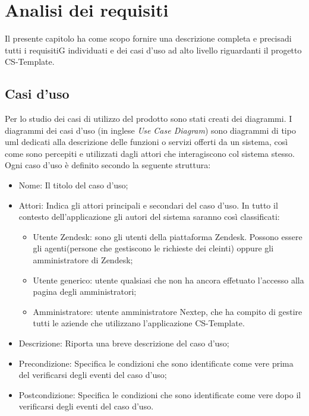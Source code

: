 
\chapter{Analisi dei requisiti}
\label{cap:analisi-requisiti}
Il presente capitolo ha come scopo fornire una descrizione completa e precisadi tutti i requisitiG individuati e dei casi d’uso ad alto livello riguardanti il progetto CS-Template.

\section{Casi d'uso}

Per lo studio dei casi di utilizzo del prodotto sono stati creati dei diagrammi.
I diagrammi dei casi d'uso (in inglese \emph{Use Case Diagram}) sono diagrammi di tipo \gls{uml} dedicati alla descrizione delle funzioni o servizi offerti da un sistema, così come sono percepiti e utilizzati dagli attori che interagiscono col sistema stesso.
Ogni caso d’uso è definito secondo la seguente struttura:
\begin{itemize}
	\item Nome: Il titolo del caso d’uso;
	\item Attori: Indica gli attori principali e secondari del caso d’uso. In tutto il contesto
	dell’applicazione gli autori del sistema saranno così classificati:
	\begin{itemize}
		\item Utente Zendesk: sono gli utenti della piattaforma Zendesk. Possono essere gli agenti(persone che gestiscono le richieste dei cleinti) oppure gli amministratore di Zendesk;
		\item Utente generico: utente qualsiasi che non ha ancora effetuato l'accesso alla pagina degli amministratori;
		 \item Amministratore: utente amministratore Nextep, che ha compito di gestire tutti le aziende che utilizzano l'applicazione CS-Template.
	\end{itemize}

	\item Descrizione: Riporta una breve descrizione del caso d’uso;
	\item Precondizione: Specifica le condizioni che sono identificate come vere prima
	del verificarsi degli eventi del caso d’uso;
	\item Postcondizione: Specifica le condizioni che sono identificate come vere dopo il
	verificarsi degli eventi del caso d’uso.

\end{itemize}

